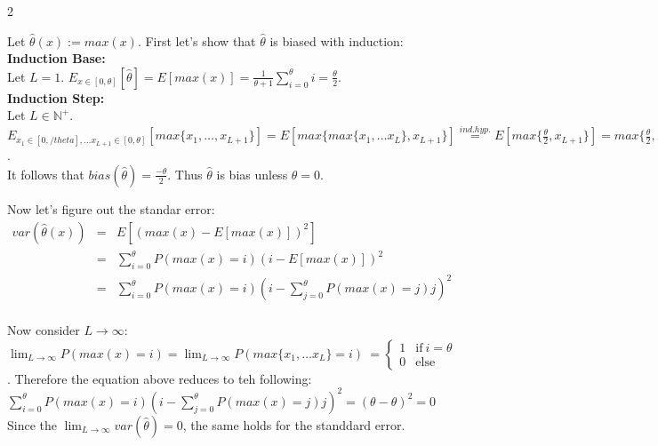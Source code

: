 \documentclass{article}
\begin{document}
\begin{ukon-infie}[3.12.17]{2}
\begin{exercise}[p=20]{}
		\question{}
		{
			Let $\hat{\theta}(x) := max(x)$. First let's show that $\hat{\theta}$ is biased with induction:\\
			\textbf{Induction Base:}\\
			Let $L=1$. $E_{x \in [0,\theta]}[\hat{\theta}] = E[max(x)] = \frac{1}{\theta + 1} \sum_{i = 0}^{\theta}i = \frac{\theta}{2}$.\\
			
			\textbf{Induction Step:}\\
			Let $L\in \mathbb{N}^+$. \\
			$E_{x_1 \in [0,/theta], \dots x_{L+1} \in [0,\theta]}[max\{x_1, \dots, x_{L+1}\}] = E[max\{max\{x_1, \dots x_L\}, x_{L+1}\}] \stackrel{ind. hyp.}{=}E[max\{\frac{\theta}{2}, x_{L+1}\}] = max\{\frac{\theta}{2}, E_{x_{L+1}\in [0,\theta]}[x_{L+1}]\} = max\{\frac{\theta}{2}, \frac{\theta}{2}\} = \frac{\theta}{2}$. \\
			It follows that $bias(\hat{\theta}) = \frac{-\theta}{2}$. Thus $\hat{\theta}$ is bias unless $\theta = 0$.
			
			Now let's figure out the standar error:\\
			
			
			\begin{eqnarray*}
			var(\hat{\theta}(x)) 
			&=& E[(max(x) - E[max(x)])^2] \\
			&=& \sum_{i = 0}^{\theta} P(max(x) = i) (i - E[max(x)])^2 \\
			&=& \sum_{i = 0}^{\theta} P(max(x) = i) (i - \sum_{j = 0}^{\theta}P(max(x) = j) j)^2
			\end{eqnarray*}
			\\
			 Now consider $L \rightarrow \infty$: \\
			$\lim_{L \to \infty} P(max(x) = i) = \lim_{L \to \infty} P(max\{x_1, \dots x_L\} = i)  ~ = \begin{cases}
     1 & \text{if} ~ i = \theta \\
     0 & \text{else} 
   \end{cases}$.
   Therefore the equation above reduces to teh following:\\
   $\sum_{i = 0}^{\theta} P(max(x) = i) (i - \sum_{j = 0}^{\theta}P(max(x) = j) j)^2 = (\theta - \theta)^2  = 0$
   \\
   Since the $\lim_{L \to \infty}var(\hat{\theta}) = 0$, the same holds for the standdard error.
		}
		\end{exercise}
		
		
\end{ukon-infie}
\end{document}
